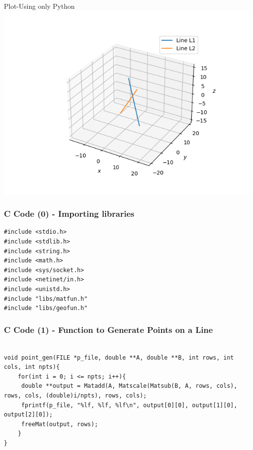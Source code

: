 \documentclass{beamer}
\begin{document}
\begin{frame}{Plot-Using only Python}
    \centering
    \includegraphics[width=\columnwidth, height=0.8\textheight, keepaspectratio]{../figs/fig.png}     
\end{frame}

\begin{frame}[fragile]
    \frametitle{C Code (0) - Importing libraries}

    \begin{lstlisting}
#include <stdio.h>
#include <stdlib.h>
#include <string.h>
#include <math.h>
#include <sys/socket.h>
#include <netinet/in.h>
#include <unistd.h>
#include "libs/matfun.h"
#include "libs/geofun.h"
    \end{lstlisting}
\end{frame}
\begin{frame}[fragile]
    \frametitle{C Code (1) - Function to Generate Points on a Line}

    \begin{lstlisting}

void point_gen(FILE *p_file, double **A, double **B, int rows, int cols, int npts){
    for(int i = 0; i <= npts; i++){
     double **output = Matadd(A, Matscale(Matsub(B, A, rows, cols), rows, cols, (double)i/npts), rows, cols);
     fprintf(p_file, "%lf, %lf, %lf\n", output[0][0], output[1][0], output[2][0]);
     freeMat(output, rows);
    }
}

    \end{lstlisting}
\end{frame}
\end{document}
